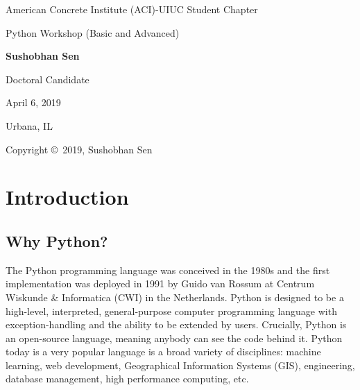 \documentclass[12pt]{article}
\begin{document}
 
        

\begin{titlepage}
	\centering
	{\LARGE American Concrete Institute (ACI)-UIUC Student Chapter}
	\vspace{2cm}	
	
	\begin{Large}
	Python Workshop (Basic and Advanced)
	\vspace{1cm}
	
	\textbf{Sushobhan Sen}
	\vspace{1cm}
	
	Doctoral Candidate
	\vspace{1cm}
	
	April 6, 2019
	\vspace{1cm}
	
	Urbana, IL
	\end{Large}
\end{titlepage}

Copyright \copyright\ 2019, Sushobhan Sen

\newpage

\tableofcontents
\newpage

\section{Introduction}
\subsection{Why Python?}
The Python programming language was conceived in the 1980s and the first implementation was deployed in 1991 by Guido van Rossum at Centrum Wiskunde \& Informatica (CWI) in the Netherlands. Python is designed to be a high-level, interpreted, general-purpose computer programming language with exception-handling and the ability to be extended by users. Crucially, Python is an open-source language, meaning anybody can see the code behind it. Python today is a very popular language is a broad variety of disciplines: machine learning, web development, Geographical Information Systems (GIS), engineering, database management, high performance computing, etc.
\end{document}
